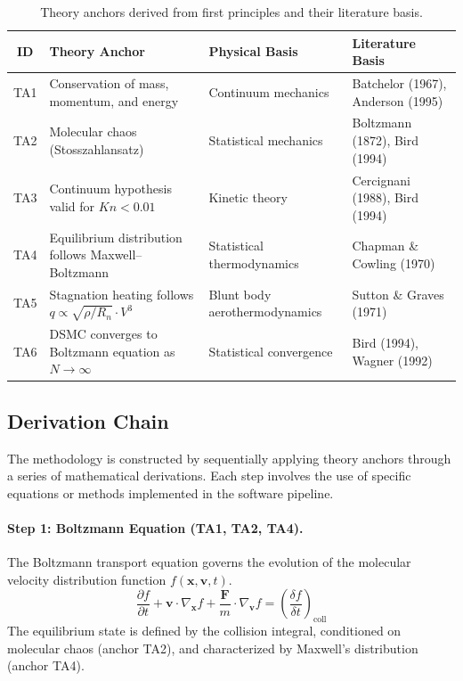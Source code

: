 \begin{table}[H]
\centering
\caption{Theory anchors derived from first principles and their literature basis.}
\label{tab:theory_anchors}
\begin{tabularx}{\textwidth}{@{}c >{\RaggedRight\arraybackslash}X >{\RaggedRight\arraybackslash}p{} >{\RaggedRight\arraybackslash}p{}@{}}
\toprule
\textbf{ID} & \textbf{Theory Anchor} & \textbf{Physical Basis} & \textbf{Literature Basis} \\ \midrule
TA1 & Conservation of mass, momentum, and energy & Continuum mechanics & Batchelor (1967), Anderson (1995) \\
TA2 & Molecular chaos (Stosszahlansatz) & Statistical mechanics & Boltzmann (1872), Bird (1994) \\
TA3 & Continuum hypothesis valid for $Kn < 0.01$ & Kinetic theory & Cercignani (1988), Bird (1994) \\
TA4 & Equilibrium distribution follows Maxwell--Boltzmann & Statistical thermodynamics & Chapman \& Cowling (1970) \\
TA5 & Stagnation heating follows $q \propto \sqrt{\rho/R_n} \cdot V^3$ & Blunt body aerothermodynamics & Sutton \& Graves (1971) \\
TA6 & DSMC converges to Boltzmann equation as $N \to \infty$ & Statistical convergence & Bird (1994), Wagner (1992) \\
\bottomrule
\end{tabularx}
\end{table}

\subsection{Derivation Chain}
The methodology is constructed by sequentially applying theory anchors through a series of mathematical derivations. Each step involves the use of specific equations or methods implemented in the software pipeline.

\paragraph{Step 1: Boltzmann Equation (TA1, TA2, TA4).}
The Boltzmann transport equation governs the evolution of the molecular velocity distribution function $f(\mathbf{x}, \mathbf{v}, t)$.
\begin{equation}
\frac{\partial f}{\partial t} + \mathbf{v} \cdot \nabla_{\mathbf{x}} f + \frac{\mathbf{F}}{m} \cdot \nabla_{\mathbf{v}} f = \left(\frac{\delta f}{\delta t}\right)_{\text{coll}}
\label{eq:boltzmann_dsmc}
\end{equation}
The equilibrium state is defined by the collision integral, conditioned on molecular chaos (anchor TA2), and characterized by Maxwell's distribution (anchor TA4).

